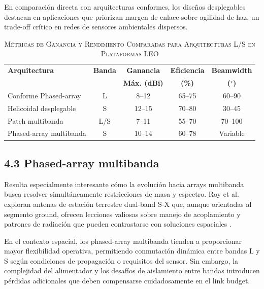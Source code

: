 En comparación directa con arquitecturas conformes, los diseños desplegables destacan en aplicaciones que priorizan margen de enlace sobre agilidad de haz, un trade-off crítico en redes de sensores ambientales dispersos.

\begin{table}[htbp]
\renewcommand{\arraystretch}{1.5} %
\centering
\caption{\textsc{Métricas de Ganancia y Rendimiento Comparadas para Arquitecturas L/S en Plataformas LEO}}
\label{tab:metricas_antenas_leo}
\begin{tabularx}{\columnwidth}{|X|c|c|c|c|}
\hline
\textbf{Arquitectura} & \textbf{Banda} & \textbf{Ganancia} & \textbf{Eficiencia} & \textbf{Beamwidth} \\
\textbf{} & \textbf{} & \textbf{Máx. (dBi)} & \textbf{(\%)} & \textbf{($^{\circ}$)} \\ \hline
Conforme Phased-array & L & 8–12 & 65–75 & 60–90 \\ \hline
Helicoidal desplegable & S & 12–15 & 70–80 & 30–45 \\ \hline
Patch multibanda & L/S & 7–11 & 55–70 & 70–100 \\ \hline
Phased-array multibanda & S & 10–14 & 60–78 & Variable \\ \hline
\end{tabularx}
\end{table}

\subsection{4.3 Phased-array multibanda}

Resulta especialmente interesante cómo la evolución hacia arrays multibanda busca resolver simultáneamente restricciones de masa y espectro. Roy et al. exploran antenas de estación terrestre dual-band S-X que, aunque orientadas al segmento ground, ofrecen lecciones valiosas sobre manejo de acoplamiento y patrones de radiación que pueden contrastarse con soluciones espaciales \cite{Roy2022}.

En el contexto espacial, los phased-array multibanda tienden a proporcionar mayor flexibilidad operativa, permitiendo conmutación dinámica entre bandas L y S según condiciones de propagación o requisitos del sensor. Sin embargo, la complejidad del alimentador y los desafíos de aislamiento entre bandas introducen pérdidas adicionales que deben compensarse cuidadosamente en el link budget.

